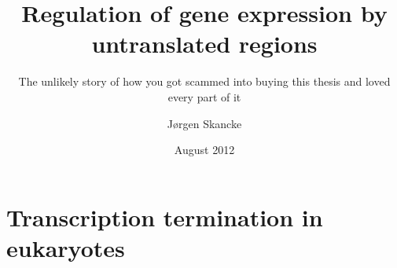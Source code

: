 \documentclass[]{ntnuthesis}
\title{Regulation of gene expression by untranslated regions}
\author{J\o rgen Skancke}
\subtitle{The unlikely story of how you got scammed into buying this thesis and
loved every part of it}
\date{August 2012}
\begin{document}
 

\frontmatter


%


\mainmatter


%

%
%



%

\section{Transcription termination in eukaryotes}

\end{document}
